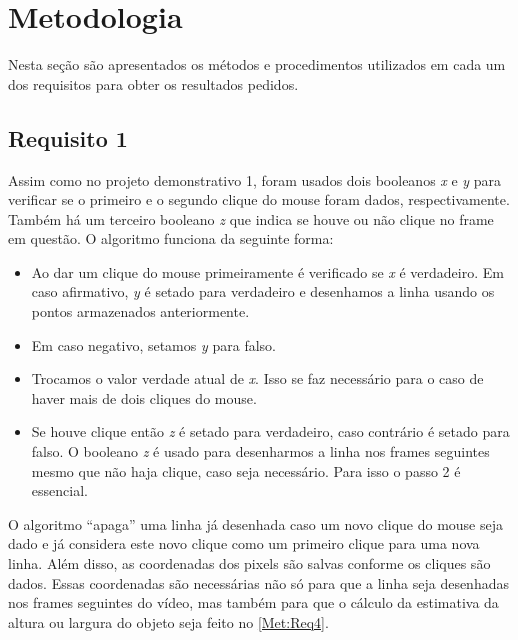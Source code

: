 \documentclass{bmvc2k}
\begin{document}
\section{Metodologia}
\label{sec:Methods}
Nesta seção são apresentados os métodos e procedimentos utilizados em cada um dos requisitos para obter os resultados pedidos.
\subsection{Requisito 1}
Assim como no projeto demonstrativo 1, foram usados dois booleanos \textit{x} e \textit{y} para verificar se o primeiro e o segundo clique do mouse foram dados, respectivamente. Também há um terceiro booleano \textit{z} que indica se houve ou não clique no frame em questão. O algoritmo funciona da seguinte forma:
\begin{itemize}
\item Ao dar um clique do mouse primeiramente é verificado se \textit{x} é verdadeiro. Em caso afirmativo, \textit{y} é setado para verdadeiro e desenhamos a linha usando os pontos armazenados anteriormente.
\item Em caso negativo, setamos \textit{y} para falso.
\item Trocamos o valor verdade atual de \textit{x}. Isso se faz necessário para o caso de haver mais de dois cliques do mouse.
\item Se houve clique então \textit{z} é setado para verdadeiro, caso contrário é setado para falso. O booleano \textit{z} é usado para desenharmos a linha nos frames seguintes mesmo que não haja clique, caso seja necessário. Para isso o passo 2 é essencial.
\end{itemize}
O algoritmo ``apaga'' uma linha já desenhada caso um novo clique do mouse seja dado e já considera este novo clique como um primeiro clique para uma nova linha. Além disso, as coordenadas dos pixels são salvas conforme os cliques são dados. Essas coordenadas são necessárias não só para que a linha seja desenhadas nos frames seguintes do vídeo, mas também para que o cálculo da estimativa da altura ou largura do objeto seja feito no \ref{Met:Req4}.
\end{document}
